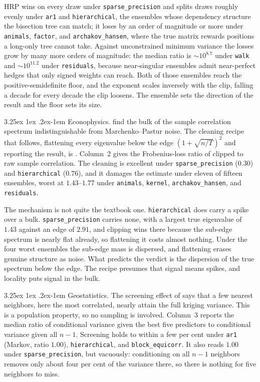 \documentclass[11pt]{article}
\makeatletter
\renewcommand\paragraph{\@startsection{paragraph}{4}{\z@}%
  {3.25ex \@plus1ex \@minus.2ex}{-1em}%
  {\normalfont\normalsize\itshape}}
\renewcommand\paragraph{\@startsection{paragraph}{4}{\z@}%
  {3.25ex \@plus1ex \@minus.2ex}{-1em}%
  {\normalfont\normalsize\itshape}}
\makeatother
\begin{document}
HRP wins on every draw under \texttt{sparse\_precision} and
splits draws roughly evenly under \texttt{ar1} and \texttt{hierarchical},
the ensembles whose dependency structure the bisection tree can match; it
loses by an order of magnitude or more under \texttt{animals},
\texttt{factor}, and \texttt{archakov\_hansen}, where the true matrix
rewards positions a long-only tree cannot take. Against unconstrained
minimum variance the losses grow by many more orders of magnitude: the
median ratio is $\sim\!10^{8.7}$ under \texttt{walk} and $\sim\!10^{11.2}$
under \texttt{residuals}, because near-singular ensembles admit
near-perfect hedges that only signed weights can reach. Both of those
ensembles reach the positive-semidefinite floor, and the exponent scales
inversely with the clip, falling a decade for every decade the clip
loosens. The ensemble sets the direction of the result and the floor sets
its size.

\paragraph{Econophysics.} \citet{laloux1999} find the bulk of the sample correlation spectrum
indistinguishable from Marchenko--Pastur noise. The cleaning recipe that
follows, flattening every eigenvalue below the edge $(1+\sqrt{n/T})^{2}$
and reporting the result, is \citet{laloux2000}. Column~2 gives the
Frobenius-loss ratio of clipped to raw sample correlation. The cleaning is
excellent under \texttt{sparse\_precision} ($0.30$) and
\texttt{hierarchical} ($0.76$), and it damages the estimate under eleven
of fifteen ensembles, worst at $1.43$--$1.77$ under \texttt{animals},
\texttt{kernel}, \texttt{archakov\_hansen}, and \texttt{residuals}.

The mechanism is not quite the textbook one. \texttt{hierarchical} does
carry a spike over a bulk. \texttt{sparse\_precision} carries none, with a
largest true eigenvalue of $1.43$ against an edge of $2.91$, and clipping
wins there because the sub-edge spectrum is nearly flat already, so
flattening it costs almost nothing. Under the four worst ensembles the
sub-edge mass is dispersed, and flattening erases genuine structure as
noise. What predicts the verdict is the dispersion of the true spectrum
below the edge. The recipe presumes that signal means spikes, and locality
puts signal in the bulk.

\paragraph{Geostatistics.} The screening effect of \citet{stein2002} says
that a few nearest neighbors, here the most correlated, nearly attain the
full kriging variance. This is a population property, so no sampling is
involved. Column~3 reports the median ratio of conditional variance given
the best five predictors to conditional variance given all $n-1$.
Screening holds to within a few per cent under \texttt{ar1} (Markov,
ratio $1.00$), \texttt{hierarchical}, and \texttt{block\_equicorr}. It also reads
$1.00$ under \texttt{sparse\_precision}, but vacuously: conditioning on all
$n-1$ neighbors removes only about four per cent of the variance there, so
there is nothing for five neighbors to miss.
\end{document}
